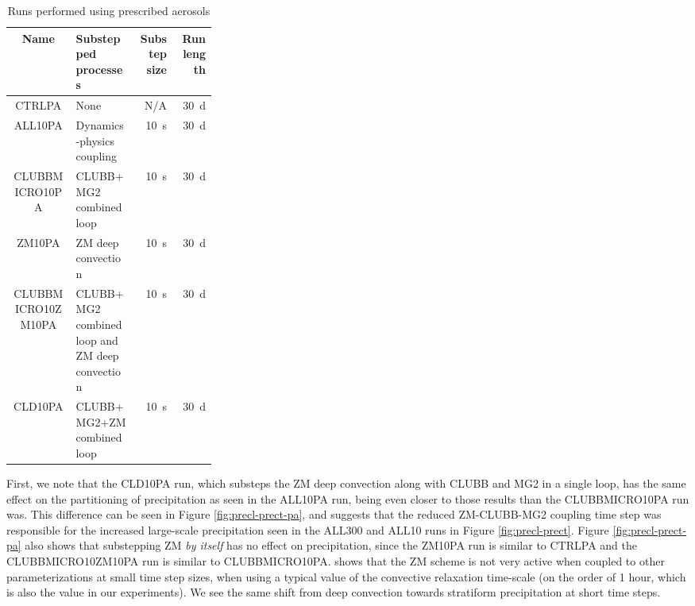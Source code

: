 \documentclass [11pt, proquest] {uwthesis}[2020/02/24]
\begin{document}
\begin{table}
  \centering
  \begin{tabular}{|c|p{0.3\linewidth}|r|r|}
    \hline
    Name & Substepped processes & Substep size & Run length \\
    \hline
    CTRLPA & None & N/A & \SI{30}{\day} \\
    \hline
    ALL10PA & Dynamics-physics coupling & \SI{10}{\second} & \SI{30}{\day} \\
    \hline
    CLUBBMICRO10PA & CLUBB+MG2 combined loop & \SI{10}{\second} & \SI{30}{\day} \\
    \hline
    ZM10PA & ZM deep convection & \SI{10}{\second} & \SI{30}{\day} \\
    \hline
    CLUBBMICRO10ZM10PA & CLUBB+MG2 combined loop and ZM deep convection & \SI{10}{\second} & \SI{30}{\day} \\
    \hline
    CLD10PA & CLUBB+MG2+ZM combined loop & \SI{10}{\second} & \SI{30}{\day} \\
    \hline
  \end{tabular}
  \caption{Runs performed using prescribed aerosols}
  \label{tab:pa-runs}
\end{table}

First, we note that the CLD10PA run, which substeps the ZM deep convection along with CLUBB and MG2 in a single loop, has the same effect on the partitioning of precipitation as seen in the ALL10PA run, being even closer to those results than the CLUBBMICRO10PA run was. This difference can be seen in Figure \ref{fig:precl-prect-pa}, and suggests that the reduced ZM-CLUBB-MG2 coupling time step was responsible for the increased large-scale precipitation seen in the ALL300 and ALL10 runs in Figure \ref{fig:precl-prect}. Figure \ref{fig:precl-prect-pa} also shows that substepping ZM \emph{by itself} has no effect on precipitation, since the ZM10PA run is similar to CTRLPA and the CLUBBMICRO10ZM10PA run is similar to CLUBBMICRO10PA. \textcite{Williamson2013} shows that the ZM scheme is not very active when coupled to other parameterizations at small time step sizes, when using a typical value of the convective relaxation time-scale (on the order of \num{1} hour, which is also the value in our experiments). We see the same shift from deep convection towards stratiform precipitation at short time steps.
\end{document}
